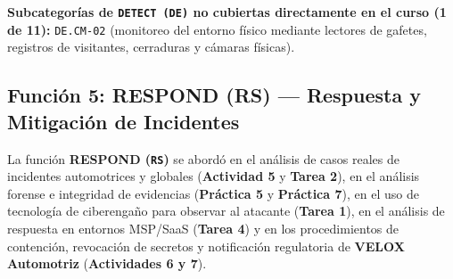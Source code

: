 \documentclass[letterpaper,11pt]{article}
\begin{document}
\noindent\textbf{Subcategorías de \texttt{DETECT (DE)} no cubiertas directamente en el curso (1 de 11):} \texttt{DE.CM-02} (monitoreo del entorno físico mediante lectores de gafetes, registros de visitantes, cerraduras y cámaras físicas).

\subsection{Función 5: RESPOND (RS) --- Respuesta y Mitigación de Incidentes}

La función \textbf{RESPOND (\texttt{RS})} se abordó en el análisis de casos reales de incidentes automotrices y globales (\textbf{Actividad 5} y \textbf{Tarea 2}), en el análisis forense e integridad de evidencias (\textbf{Práctica 5} y \textbf{Práctica 7}), en el uso de tecnología de ciberengaño para observar al atacante (\textbf{Tarea 1}), en el análisis de respuesta en entornos MSP/SaaS (\textbf{Tarea 4}) y en los procedimientos de contención, revocación de secretos y notificación regulatoria de \textbf{VELOX Automotriz} (\textbf{Actividades 6 y 7}).
\end{document}
